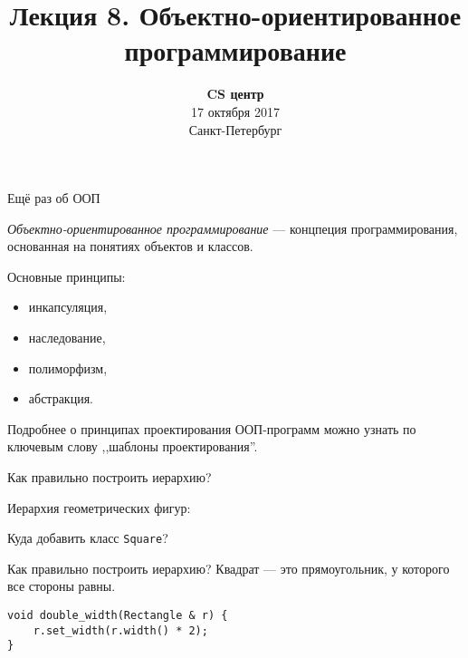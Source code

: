 \documentclass{beamer}
\title[ООП]{Лекция 8. Объектно-ориентированное программирование}
\date{
   \textbf{CS центр}\\
   17 октября 2017 \\
   Санкт-Петербург
}
\begin{document}
\begin{frame} 
  \titlepage
\end{frame}

\begin{frame}[fragile]{Ещё раз об ООП}

    {\em Объектно-ориентированное программирование} — 
    концпеция программирования, основанная на
    понятиях объектов и классов.

   \begin{block}{Основные принципы:}
   \begin{itemize}
       \item инкапсуляция,
       \item наследование,
       \item полиморфизм,
       \item абстракция.
   \end{itemize}
   \end{block}

   Подробнее о принципах проектирования ООП-программ
   можно узнать по ключевым слову ,,шаблоны проектирования''.
\end{frame}

\begin{frame}[fragile]{Как правильно построить иерархию?}

    Иерархия геометрических фигур:

\begin{center}
\end{center}
\vspace{2cm}

Куда добавить класс {\tt Square}?
\end{frame}

\begin{frame}[fragile]{Как правильно построить иерархию?}
    Квадрат — это прямоугольник, у которого все стороны равны.
\begin{center}
\end{center}
\vspace{-2mm}
\begin{lstlisting}
void double_width(Rectangle & r) {
    r.set_width(r.width() * 2);
}
\end{lstlisting}
\end{frame}
\end{document}
